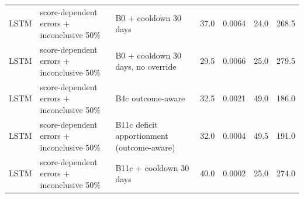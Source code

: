 \documentclass[10pt,onecolumn,letterpaper]{article}
\begin{document}
\begin{longtable}{lp{5.2cm}p{4.4cm}cccc}
LSTM & score-dependent errors + inconclusive 50\% & B0 + cooldown 30 days & 37.0 & 0.0064 & 24.0 & 268.5 \\
LSTM & score-dependent errors + inconclusive 50\% & B0 + cooldown 30 days, no override & 29.5 & 0.0066 & 25.0 & 279.5 \\
LSTM & score-dependent errors + inconclusive 50\% & B4c outcome-aware & 32.5 & 0.0021 & 49.0 & 186.0 \\
LSTM & score-dependent errors + inconclusive 50\% & B11c deficit apportionment (outcome-aware) & 32.0 & 0.0004 & 49.5 & 191.0 \\
LSTM & score-dependent errors + inconclusive 50\% & B11c + cooldown 30 days & 40.0 & 0.0002 & 25.0 & 274.0 \\
\bottomrule
\end{longtable}
\end{document}
